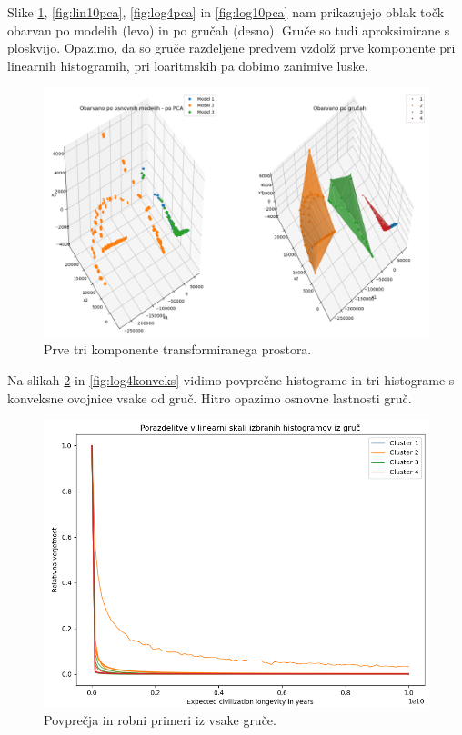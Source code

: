 \documentclass[a4paper]{IEEEtran}
\begin{document}
Slike  \ref{fig:lin4pca}, \ref{fig:lin10pca}, \ref{fig:log4pca} in \ref{fig:log10pca} nam prikazujejo oblak točk obarvan po modelih (levo) in po gručah (desno). Gruče so tudi aproksimirane s ploskvijo. Opazimo, da so gruče razdeljene predvem vzdolž prve komponente pri linearnih histogramih, pri loaritmskih pa dobimo zanimive luske.

\begin{figure}
	\centering
	\includegraphics[width=0.9\linewidth]{Figures/lin4pca}
	\caption{Prve tri komponente transformiranega prostora.}
	\label{fig:lin4pca}
\end{figure}

Na slikah \ref{fig:lin4konveks} in \ref{fig:log4konveks} vidimo povprečne histograme in tri histograme s konveksne ovojnice vsake od gruč. Hitro opazimo osnovne lastnosti gruč.

\begin{figure}
	\centering
	\includegraphics[width=0.8\linewidth]{Figures/lin4konveks}
	\caption{Povprečja in robni primeri iz vsake gruče.}
	\label{fig:lin4konveks}
\end{figure}
\end{document}
